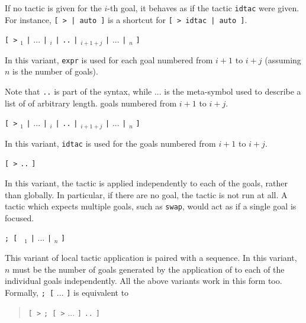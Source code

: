 \begin{Variants}
  \item If no tactic is given for the $i$-th goal, it behaves as if
    the tactic {\tt idtac} were given. For instance, {\tt [~> | auto
    ]} is a shortcut for {\tt [ > idtac | auto ]}.

  \item {\tt [ >} {\tacexpr}$_1$ {\tt |} $...$ {\tt |}
    {\tacexpr}$_i$ {\tt |} {\tacexpr} {\tt ..} {\tt |}
    {\tacexpr}$_{i+1+j}$ {\tt |} $...$ {\tt |} {\tacexpr}$_n$ {\tt ]}

  In this variant, {\tt expr} is used for each goal numbered from
  $i+1$ to $i+j$ (assuming $n$ is the number of goals).

  Note that {\tt ..} is part of the syntax, while $...$ is the meta-symbol used
  to describe a list of {\tacexpr} of arbitrary length.
  goals numbered from $i+1$ to $i+j$.

  \item {\tt [ >} {\tacexpr}$_1$ {\tt |} $...$ {\tt |}
    {\tacexpr}$_i$ {\tt |} {\tt ..} {\tt |} {\tacexpr}$_{i+1+j}$ {\tt |}
    $...$ {\tt |} {\tacexpr}$_n$ {\tt ]}

  In this variant, {\tt idtac} is used for the goals numbered from
  $i+1$ to $i+j$.

  \item {\tt [ >} {\tacexpr} {\tt ..} {\tt ]}

    In this variant, the tactic {\tacexpr} is applied independently to
    each of the goals, rather than globally. In particular, if there
    are no goal, the tactic is not run at all. A tactic which
    expects multiple goals, such as {\tt swap}, would act as if a single
    goal is focused.

  \item {\tacexpr} {\tt ; [ } {\tacexpr}$_1$ {\tt |} $...$ {\tt |} {\tacexpr}$_n$ {\tt ]}

    This variant of local tactic application is paired with a
    sequence.  In this variant, $n$ must be the number of goals
    generated by the application of {\tacexpr} to each of the
    individual goals independently. All the above variants work in
    this form too. Formally, {\tacexpr} {\tt ; [} $...$ {\tt ]} is
    equivalent to
    \begin{quote}
    {\tt [ >} {\tacexpr} {\tt ; [ >} $...$ {\tt ]} {\tt ..} {\tt ]}
    \end{quote}

\end{Variants}

